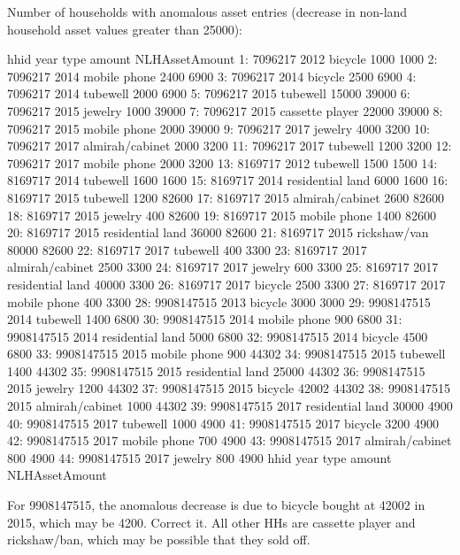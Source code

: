 Number of households with anomalous asset entries (decrease in non-land household asset values greater than 25000):
\begin{Schunk}
\begin{Soutput}
          hhid year             type amount NLHAssetAmount
 1:    7096217 2012          bicycle   1000           1000
 2:    7096217 2014     mobile phone   2400           6900
 3:    7096217 2014          bicycle   2500           6900
 4:    7096217 2014         tubewell   2000           6900
 5:    7096217 2015         tubewell  15000          39000
 6:    7096217 2015          jewelry   1000          39000
 7:    7096217 2015  cassette player  22000          39000
 8:    7096217 2015     mobile phone   2000          39000
 9:    7096217 2017          jewelry   4000           3200
10:    7096217 2017  almirah/cabinet   2000           3200
11:    7096217 2017         tubewell   1200           3200
12:    7096217 2017     mobile phone   2000           3200
13:    8169717 2012         tubewell   1500           1500
14:    8169717 2014         tubewell   1600           1600
15:    8169717 2014 residential land   6000           1600
16:    8169717 2015         tubewell   1200          82600
17:    8169717 2015  almirah/cabinet   2600          82600
18:    8169717 2015          jewelry    400          82600
19:    8169717 2015     mobile phone   1400          82600
20:    8169717 2015 residential land  36000          82600
21:    8169717 2015     rickshaw/van  80000          82600
22:    8169717 2017         tubewell    400           3300
23:    8169717 2017  almirah/cabinet   2500           3300
24:    8169717 2017          jewelry    600           3300
25:    8169717 2017 residential land  40000           3300
26:    8169717 2017          bicycle   2500           3300
27:    8169717 2017     mobile phone    400           3300
28: 9908147515 2013          bicycle   3000           3000
29: 9908147515 2014         tubewell   1400           6800
30: 9908147515 2014     mobile phone    900           6800
31: 9908147515 2014 residential land   5000           6800
32: 9908147515 2014          bicycle   4500           6800
33: 9908147515 2015     mobile phone    900          44302
34: 9908147515 2015         tubewell   1400          44302
35: 9908147515 2015 residential land  25000          44302
36: 9908147515 2015          jewelry   1200          44302
37: 9908147515 2015          bicycle  42002          44302
38: 9908147515 2015  almirah/cabinet   1000          44302
39: 9908147515 2017 residential land  30000           4900
40: 9908147515 2017         tubewell   1000           4900
41: 9908147515 2017          bicycle   3200           4900
42: 9908147515 2017     mobile phone    700           4900
43: 9908147515 2017  almirah/cabinet    800           4900
44: 9908147515 2017          jewelry    800           4900
          hhid year             type amount NLHAssetAmount
\end{Soutput}
\end{Schunk}
For 9908147515, the anomalous decrease is due to bicycle bought at 42002 in 2015, which may be 4200. Correct it. All other HHs are cassette player and rickshaw/ban, which may be possible that they sold off.



